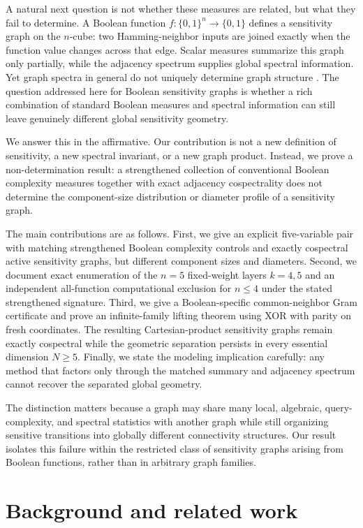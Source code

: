\documentclass[twoside,12pt,letterpaper]{article}
\theoremstyle{definition}
\begin{document}
A natural next question is not whether these measures are related, but what they fail to determine. A Boolean function $f:\{0,1\}^n\to\{0,1\}$ defines a sensitivity graph on the $n$-cube: two Hamming-neighbor inputs are joined exactly when the function value changes across that edge. Scalar measures summarize this graph only partially, while the adjacency spectrum supplies global spectral information. Yet graph spectra in general do not uniquely determine graph structure \parencite{godsil2001,brouwer2012,cvetkovic2010}. The question addressed here for Boolean sensitivity graphs is whether a rich combination of standard Boolean measures and spectral information can still leave genuinely different global sensitivity geometry.

We answer this in the affirmative. Our contribution is not a new definition of sensitivity, a new spectral invariant, or a new graph product. Instead, we prove a non-determination result: a strengthened collection of conventional Boolean complexity measures together with exact adjacency cospectrality does not determine the component-size distribution or diameter profile of a sensitivity graph.

The main contributions are as follows. First, we give an explicit five-variable pair with matching strengthened Boolean complexity controls and exactly cospectral active sensitivity graphs, but different component sizes and diameters. Second, we document exact enumeration of the $n=5$ fixed-weight layers $k=4,5$ and an independent all-function computational exclusion for $n\le4$ under the stated strengthened signature. Third, we give a Boolean-specific common-neighbor Gram certificate and prove an infinite-family lifting theorem using XOR with parity on fresh coordinates. The resulting Cartesian-product sensitivity graphs remain exactly cospectral while the geometric separation persists in every essential dimension $N\ge5$. Finally, we state the modeling implication carefully: any method that factors only through the matched summary and adjacency spectrum cannot recover the separated global geometry.

The distinction matters because a graph may share many local, algebraic, query-complexity, and spectral statistics with another graph while still organizing sensitive transitions into globally different connectivity structures. Our result isolates this failure within the restricted class of sensitivity graphs arising from Boolean functions, rather than in arbitrary graph families.

\section{Background and related work}
\end{document}
